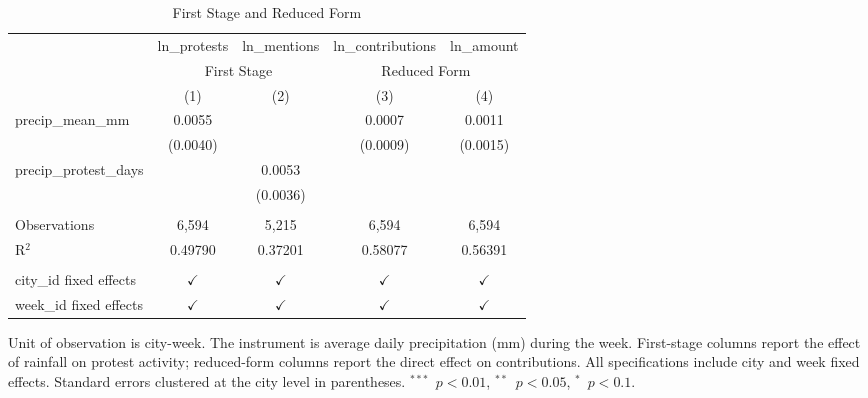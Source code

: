 
\begin{table}[htbp]
   \caption{\label{tab:first_stage} First Stage and Reduced Form}
   \bigskip
   \centering
   \begin{tabular}{lcccc}
      \toprule
                              & ln\_protests  & ln\_mentions  & ln\_contributions  & ln\_amount\\   
       & \multicolumn{2}{c}{First Stage} & \multicolumn{2}{c}{Reduced Form} \\ 
                              & (1)           & (2)           & (3)                & (4)\\  
      \midrule 
      precip\_mean\_mm        & 0.0055        &               & 0.0007             & 0.0011\\   
                              & (0.0040)      &               & (0.0009)           & (0.0015)\\   
      precip\_protest\_days   &               & 0.0053        &                    &   \\   
                              &               & (0.0036)      &                    &   \\   
       \\
      Observations            & 6,594         & 5,215         & 6,594              & 6,594\\  
      R$^2$                   & 0.49790       & 0.37201       & 0.58077            & 0.56391\\  
       \\
      city\_id fixed effects  & $\checkmark$  & $\checkmark$  & $\checkmark$       & $\checkmark$\\   
      week\_id fixed effects  & $\checkmark$  & $\checkmark$  & $\checkmark$       & $\checkmark$\\   
      \bottomrule
   \end{tabular}
   
   \par \raggedright 
   Unit of observation is city-week. The instrument is average daily precipitation (mm) during the week. First-stage columns report the effect of rainfall on protest activity; reduced-form columns report the direct effect on contributions. All specifications include city and week fixed effects. Standard errors clustered at the city level in parentheses. $^{***}$~$p<0.01$, $^{**}$~$p<0.05$, $^{*}$~$p<0.1$.
\end{table}


